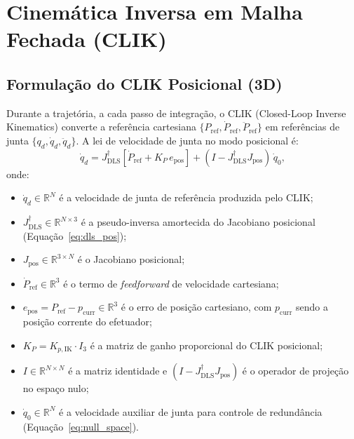 \section{Cinemática Inversa em Malha Fechada (CLIK)}
\label{sec:clik}

\subsection{Formulação do CLIK Posicional (3D)}

Durante a trajetória, a cada passo de integração, o CLIK (Closed-Loop Inverse Kinematics) \cite{samson1991robot, chiaverini1994review} converte a referência cartesiana $\{P_{\text{ref}}, \dot{P}_{\text{ref}}, \ddot{P}_{\text{ref}}\}$ em referências de junta $\{q_d, \dot{q}_d, \ddot{q}_d\}$. A lei de velocidade de junta no modo posicional é:
\begin{equation}
    \dot{q}_d = J_{\text{DLS}}^{\dagger}\left[\dot{P}_{\text{ref}} + K_P\,e_{\text{pos}}\right] + (I - J_{\text{DLS}}^{\dagger} J_{\text{pos}})\,\dot{q}_0,
    \label{eq:clik_pos}
\end{equation}
onde:
\begin{itemize}
    \item $\dot{q}_d \in \mathbb{R}^N$ é a velocidade de junta de referência produzida pelo CLIK;
    \item $J_{\text{DLS}}^{\dagger} \in \mathbb{R}^{N \times 3}$ é a pseudo-inversa amortecida do Jacobiano posicional (Equação~\eqref{eq:dls_pos});
    \item $J_{\text{pos}} \in \mathbb{R}^{3 \times N}$ é o Jacobiano posicional;
    \item $\dot{P}_{\text{ref}} \in \mathbb{R}^3$ é o termo de \textit{feedforward} de velocidade cartesiana;
    \item $e_{\text{pos}} = P_{\text{ref}} - p_{\text{curr}} \in \mathbb{R}^3$ é o erro de posição cartesiano, com $p_{\text{curr}}$ sendo a posição corrente do efetuador;
    \item $K_P = K_{p,\text{IK}} \cdot I_3$ é a matriz de ganho proporcional do CLIK posicional;
    \item $I \in \mathbb{R}^{N \times N}$ é a matriz identidade e $(I - J_{\text{DLS}}^{\dagger} J_{\text{pos}})$ é o operador de projeção no espaço nulo;
    \item $\dot{q}_0 \in \mathbb{R}^N$ é a velocidade auxiliar de junta para controle de redundância (Equação~\eqref{eq:null_space}).
\end{itemize}

